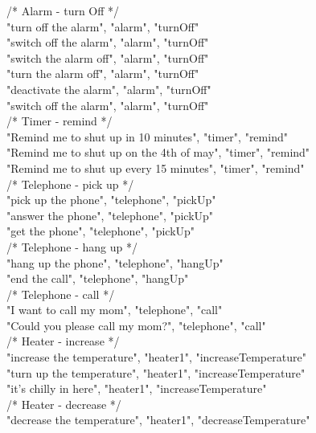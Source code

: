 \documentclass[twoside]{supsistudent}
\begin{document}
\begin{appendices}
        /*
        Alarm - turn Off
         */\\
        "turn off the alarm", "alarm", "turnOff"\\
        "switch off the alarm", "alarm", "turnOff"\\
        "switch the alarm off", "alarm", "turnOff"\\
        "turn the alarm off", "alarm", "turnOff"\\
        "deactivate the alarm", "alarm", "turnOff"\\
        "switch off the alarm", "alarm", "turnOff"\\
        /*
        Timer - remind
         */\\
        "Remind me to shut up in 10 minutes", "timer", "remind"\\
        "Remind me to shut up on the 4th of may", "timer", "remind"\\
        "Remind me to shut up every 15 minutes", "timer", "remind"\\
        /*
        Telephone - pick up
         */\\
        "pick up the phone", "telephone", "pickUp"\\
        "answer the phone", "telephone", "pickUp"\\
        "get the phone", "telephone", "pickUp"\\
         /*
        Telephone - hang up
         */\\
        "hang up the phone", "telephone", "hangUp"\\
        "end the call", "telephone", "hangUp"\\
        /*
        Telephone - call
         */\\
        "I want to call my mom", "telephone", "call"\\
        "Could you please call my mom?", "telephone", "call"\\
        /*
        Heater - increase
         */\\
        "increase the temperature", "heater1", "increaseTemperature"\\
        "turn up the temperature", "heater1", "increaseTemperature"\\
        "it’s chilly in here", "heater1", "increaseTemperature"\\
        /*
        Heater - decrease
         */\\
        "decrease the temperature", "heater1", "decreaseTemperature"\\

\end{appendices}
\end{document}
